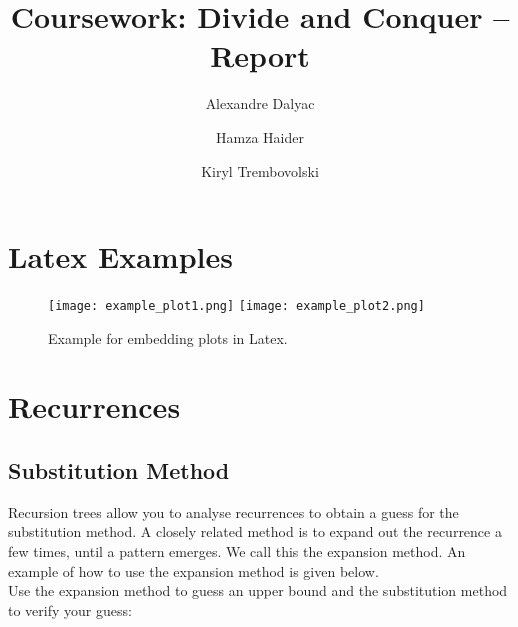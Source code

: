 \documentclass[a4paper]{article}
\title{Coursework: Divide and Conquer -- Report}
\author{Alexandre Dalyac \and Hamza Haider \and Kiryl Trembovolski}
\begin{document}
\maketitle

\section*{Latex Examples}

\begin{figure}[h]

\texttt{[image: example\_plot1.png]}
\texttt{[image: example\_plot2.png]}

\caption{Example for embedding plots in Latex.}
\label{fig:examples}
\end{figure}


\section{Recurrences}

\subsection{Substitution Method}

Recursion trees allow you to analyse recurrences to obtain a guess for the substitution method. A closely related method is to expand out the recurrence a few times, until a pattern emerges. We call this the expansion method. An example of how to use the expansion method is given below.\\
\newline
Use the expansion method to guess an upper bound and the substitution method to verify your guess:
\end{document}
